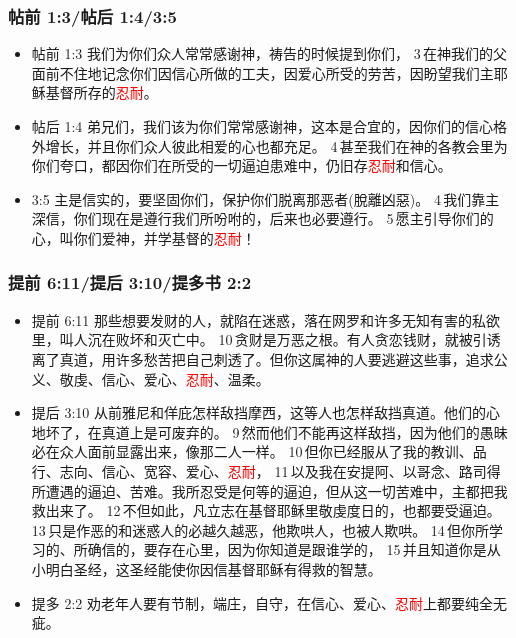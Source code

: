 \subsubsection{帖前 1:3/帖后 1:4/3:5} 
\begin{itemize}[noitemsep]
\item 帖前 1:3 我们为你们众人常常感谢神，祷告的时候提到你们， 3 在神我们的父面前不住地记念你们因信心所做的工夫，因爱心所受的劳苦，因盼望我们主耶稣基督所存的\textcolor{red}{忍耐}。
\item 帖后 1:4 弟兄们，我们该为你们常常感谢神，这本是合宜的，因你们的信心格外增长，并且你们众人彼此相爱的心也都充足。 4 甚至我们在神的各教会里为你们夸口，都因你们在所受的一切逼迫患难中，仍旧存\textcolor{red}{忍耐}和信心。
\item 3:5 主是信实的，要坚固你们，保护你们脱离那恶者(脫離凶惡)。 4 我们靠主深信，你们现在是遵行我们所吩咐的，后来也必要遵行。 5 愿主引导你们的心，叫你们爱神，并学基督的\textcolor{red}{忍耐}！
\end{itemize}

\subsubsection{提前 6:11/提后 3:10/提多书 2:2} 
\begin{itemize}[noitemsep]
\item 提前 6:11 那些想要发财的人，就陷在迷惑，落在网罗和许多无知有害的私欲里，叫人沉在败坏和灭亡中。 10 贪财是万恶之根。有人贪恋钱财，就被引诱离了真道，用许多愁苦把自己刺透了。但你这属神的人要逃避这些事，追求公义、敬虔、信心、爱心、\textcolor{red}{忍耐}、温柔。 
\item 提后 3:10 从前雅尼和佯庇怎样敌挡摩西，这等人也怎样敌挡真道。他们的心地坏了，在真道上是可废弃的。 9 然而他们不能再这样敌挡，因为他们的愚昧必在众人面前显露出来，像那二人一样。 10 但你已经服从了我的教训、品行、志向、信心、宽容、爱心、\textcolor{red}{忍耐}， 11 以及我在安提阿、以哥念、路司得所遭遇的逼迫、苦难。我所忍受是何等的逼迫，但从这一切苦难中，主都把我救出来了。 12 不但如此，凡立志在基督耶稣里敬虔度日的，也都要受逼迫。 13 只是作恶的和迷惑人的必越久越恶，他欺哄人，也被人欺哄。 14 但你所学习的、所确信的，要存在心里，因为你知道是跟谁学的， 15 并且知道你是从小明白圣经，这圣经能使你因信基督耶稣有得救的智慧。
\item 提多 2:2 劝老年人要有节制，端庄，自守，在信心、爱心、\textcolor{red}{忍耐}上都要纯全无疵。
\end{itemize}

